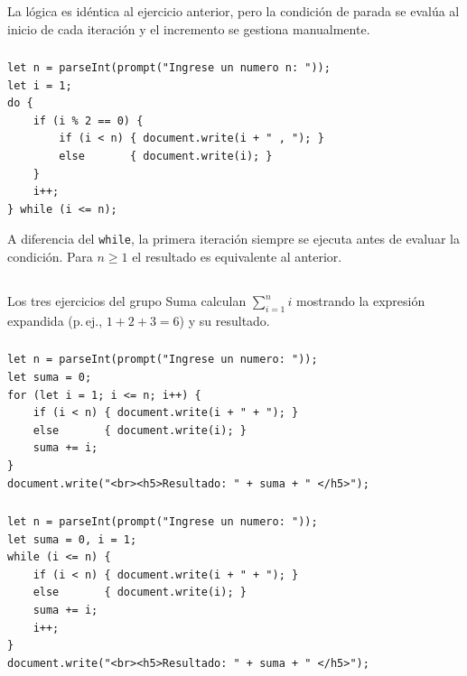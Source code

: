 \documentclass[10pt,a4paper]{article}
\begin{document}
La lógica es idéntica al ejercicio anterior, pero la condición de parada se evalúa al inicio de cada iteración y el incremento se gestiona manualmente.

\subsubsection{}

\begin{lstlisting}[style=jsStyle, caption={Pares con do-while}]
let n = parseInt(prompt("Ingrese un numero n: "));
let i = 1;
do {
    if (i % 2 == 0) {
        if (i < n) { document.write(i + " , "); }
        else       { document.write(i); }
    }
    i++;
} while (i <= n);
\end{lstlisting}

A diferencia del \texttt{while}, la primera iteración siempre se ejecuta antes de evaluar la condición. Para $n \geq 1$ el resultado es equivalente al anterior.

\subsection{\color{colorESCOM}{Grupo: Suma}}

Los tres ejercicios del grupo Suma calculan $\displaystyle\sum_{i=1}^{n} i$ mostrando la expresión expandida (p.\,ej., $1 + 2 + 3 = 6$) y su resultado.

\subsubsection{}

\begin{lstlisting}[style=jsStyle, caption={Suma con for}]
let n = parseInt(prompt("Ingrese un numero: "));
let suma = 0;
for (let i = 1; i <= n; i++) {
    if (i < n) { document.write(i + " + "); }
    else       { document.write(i); }
    suma += i;
}
document.write("<br><h5>Resultado: " + suma + " </h5>");
\end{lstlisting}

\subsubsection{}

\begin{lstlisting}[style=jsStyle, caption={Suma con while}]
let n = parseInt(prompt("Ingrese un numero: "));
let suma = 0, i = 1;
while (i <= n) {
    if (i < n) { document.write(i + " + "); }
    else       { document.write(i); }
    suma += i;
    i++;
}
document.write("<br><h5>Resultado: " + suma + " </h5>");
\end{lstlisting}
\end{document}
